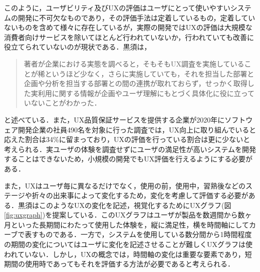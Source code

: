 このように，ユーザビリティ及びUXの評価はユーザにとって使いやすいシステムの開発に不可欠なものであり，その評価手法は定着しているもの，定着していないものを含めて様々に存在しているが，実際の開発ではUXの評価は大規模な消費者向けサービスを除いてほとんど行われていないか，行われていても改善に役立てられていないのが現状である．黒須\cite{kurosu}は，\begin{quotation}
  著者が企業における実態を調べると，そもそもUX調査を実施していることが稀というほど少なく，さらに実施していても，それを担当した部署と企画や分析を担当する部署との間の連携が取れておらず，せっかく取得した実利用に関する情報が企画やユーザ理解にもとづく具体化に役に立っていないことがわかった．
\end{quotation}と述べている．また，UX品質保証サービスを提供する企業が2020年にソフトウェア開発企業の社員490名を対象に行った調査では，UX向上に取り組んでいると応えた割合は34\%に留まっており，UXの評価を行っている割合は更に少ないと考えられる．実ユーザの体験を調査せずにユーザの満足性が高いシステムを開発することはできないため，小規模の開発でもUX評価を行えるようにする必要がある．

また，UXはユーザ毎に異なるだけでなく，使用の前，使用中，習熟後などのステージや折々の出来事によって変化するため，変化を考慮して評価する必要がある\cite{kurosu}．黒須はこのようなUXの変化を記述，視覚化するためにUXグラフ\cite{kurosu2015}(図\ref{fig:uxgraph})を提案している．このUXグラフはユーザが製品を数週間から数ヶ月といった長期間にわたって使用した体験を，縦に満足性，横を時間軸にしてカーブで表すものである．一方で，システムを使用している数分間から1時間程度の期間の変化についてはユーザに変化を記述させることが難しくUXグラフは使われていない．しかし，UXの概念では，時間軸の変化は重要な要素であり，短期間の使用時であってもそれを評価する方法が必要であると考えられる．

